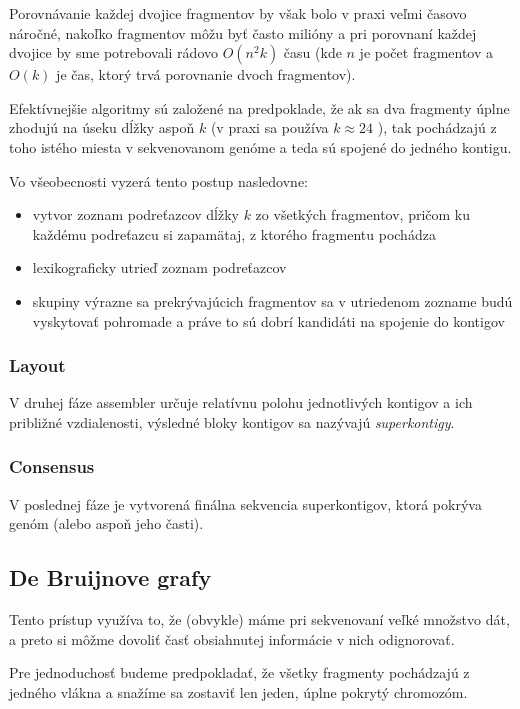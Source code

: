     Porovnávanie každej dvojice fragmentov by však bolo v praxi veľmi časovo náročné, nakoľko fragmentov môžu byť často milióny a pri porovnaní každej dvojice by sme potrebovali rádovo $O(n^2k)$ času (kde $n$ je počet fragmentov a $O(k)$ je čas, ktorý trvá porovnanie dvoch fragmentov). 
    
    Efektívnejšie algoritmy sú založené na predpoklade, že ak sa dva fragmenty úplne zhodujú na úseku dĺžky aspoň $k$ (v praxi sa používa $k \approx 24$ ), tak pochádzajú z toho istého miesta v sekvenovanom genóme a teda sú spojené do jedného kontigu. 
    
    Vo všeobecnosti vyzerá tento postup nasledovne:
    \begin{itemize}
        \item vytvor zoznam podreťazcov dĺžky $k$ zo všetkých fragmentov, pričom ku každému podreťazcu si zapamätaj, z ktorého fragmentu pochádza
        \item lexikograficky utrieď zoznam podreťazcov
        \item skupiny výrazne sa prekrývajúcich fragmentov sa v utriedenom zozname budú vyskytovať pohromade a práve to sú dobrí kandidáti na spojenie do kontigov
    \end{itemize}
    
    \subsubsection{Layout}
V druhej fáze assembler určuje relatívnu polohu jednotlivých kontigov a ich približné vzdialenosti, výsledné bloky kontigov sa nazývajú \emph{superkontigy}.

    \subsubsection{Consensus}
V poslednej fáze je vytvorená finálna sekvencia superkontigov, ktorá pokrýva genóm (alebo aspoň jeho časti).
    
    \subsection{De Bruijnove grafy}
    Tento prístup využíva to, že (obvykle) máme pri sekvenovaní veľké množstvo
    dát, a preto si môžme dovoliť časť obsiahnutej informácie v nich
    odignorovať.
    
    Pre jednoduchosť budeme predpokladať, že všetky fragmenty pochádzajú z
    jedného vlákna a snažíme sa zostaviť len jeden, úplne pokrytý chromozóm.

